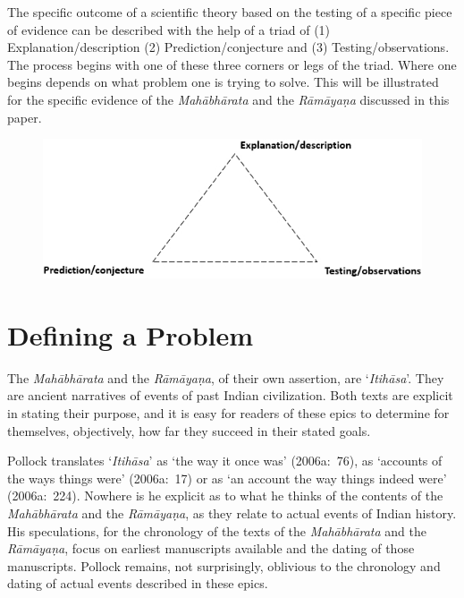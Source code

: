 The specific outcome of a scientific theory based on the testing of a specific piece of evidence can be described with the help of a triad of (1) Explanation/description (2) Prediction/conjecture and (3) Testing/observations. The process begins with one of these three corners or legs of the triad. Where one begins depends on what problem one is trying to solve. This will be illustrated for the specific evidence of the \textit{Mahābhārata} and the \textit{Rāmāyaṇa} discussed in this paper.

\begin{figure}[!h]
\includegraphics[scale=.5]{images/chap2-1.jpg}
\end{figure}


\section*{Defining a Problem}

The \textit{Mahābhārata} and the \textit{Rāmāyaṇa}, of their own assertion, are ‘\textit{Itihāsa}’. They are ancient narratives of events of past Indian civilization. Both texts are explicit in stating their purpose, and it is easy for readers of these epics to determine for themselves, objectively, how far they succeed in their stated goals.

Pollock translates ‘\textit{Itihāsa}’ as ‘the way it once was’ (2006a:~76), as ‘accounts of the ways things were’ (2006a:~17) or as ‘an account the way things indeed were’ (2006a:~224). Nowhere is he explicit as to what he thinks of the contents of the \textit{Mahābhārata} and the \textit{Rāmāyaṇa}, as they relate to actual events of Indian history. His speculations, for the chronology of the texts of the \textit{Mahābhārata} and the \textit{Rāmāyaṇa}, focus on earliest manuscripts available and the dating of those manuscripts. Pollock remains, not surprisingly, oblivious to the chronology and dating of actual events described in these epics.

